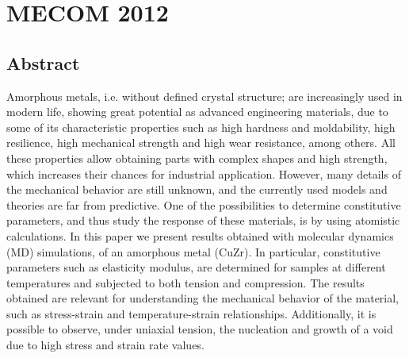 
\chapter{MECOM 2012} %

\label{C3} %


\section{Abstract}

Amorphous metals, i.e. without defined crystal structure; are increasingly used in modern life, showing great potential as advanced engineering materials, due to some of its characteristic properties such as high hardness and moldability, high resilience, high mechanical strength and high wear resistance, among others. All these properties allow obtaining parts with complex shapes and high strength, which increases their chances for industrial application. However, many details of the mechanical behavior are still unknown, and the currently used models and theories are far from predictive.
One of the possibilities to determine constitutive parameters, and thus study the response of these materials, is by using atomistic calculations. In this paper we present results obtained with molecular dynamics (MD) simulations, of an amorphous metal (CuZr). In particular, constitutive parameters such as elasticity modulus, are determined for samples at different temperatures and subjected to both tension and compression. The results obtained are relevant for understanding the mechanical behavior of the material, such as stress-strain and temperature-strain relationships. Additionally, it is possible to observe, under uniaxial tension, the nucleation and growth of a void due to high stress and strain rate values.

